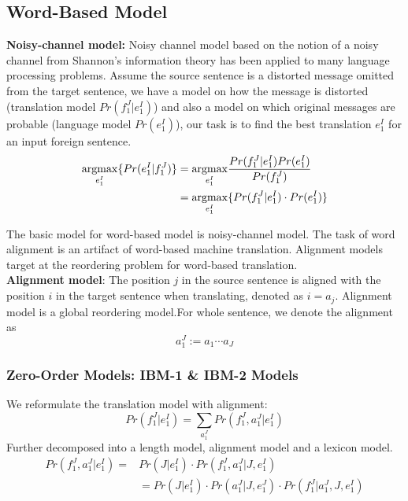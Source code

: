 \subsection{Word-Based Model}
\noindent \textbf{Noisy-channel model:}
Noisy channel model based on the notion of a noisy channel from Shannon's information theory has been applied to many language processing problems. Assume the source sentence is a distorted message omitted from the target sentence, we have a model on  how the message is distorted (translation model $Pr(f_1^J|e_1^I)$) and also a model on which original messages are probable (language model ${Pr(e_1^I)}$), our task is to find the best translation ${e_1^I}$ for an input foreign sentence.
\begin{align*}
\underset{e_1^I}{\operatorname{argmax}} \{Pr(e_1^I | f_1^J)\} & = \underset{e_1^I}{\operatorname{argmax}} {\frac{Pr(f_1^J | e_1^I)Pr(e_1^I)}{Pr(f_1^J)}} \\
& = \underset{e_1^I}{\operatorname{argmax}} { \{ Pr(f_1^J | e_1^I) \cdot  Pr(e_1^I)\} }
\end{align*} 

The basic model for word-based model is noisy-channel model. The task of word alignment is an artifact of word-based machine translation. Alignment models target at the reordering problem for word-based translation.\\
\noindent \textbf{Alignment model}: The position $j$ in the source sentence is aligned with the position $i$ in the target sentence when translating, denoted as  ${i=a_j}$. Alignment model is a global reordering model.For whole sentence, we denote the alignment as 
\[a_1^J:= a_1\cdots a_J\]
\subsubsection{Zero-Order Models: IBM-1 \& IBM-2 Models}

We reformulate the translation model with alignment:
\[ Pr(f_1^J | e_1^I) = \sum_{a_1^J} {Pr(f_1^J, a_1^J | e_1^I)}\]
Further decomposed into a length model, alignment model and a lexicon model. 
\begin{align*}
	Pr(f_1^J, a_1^J |e_1^I) = & Pr(J|e_1^I) \cdot Pr(f_1^J, a_1^J | J, e_1^I) \\
	& = Pr(J|e_1^I) \cdot Pr(a_1^J | J, e_1^J) \cdot Pr(f_1^J | a_1^J, J, e_1^I)
\end{align*}

